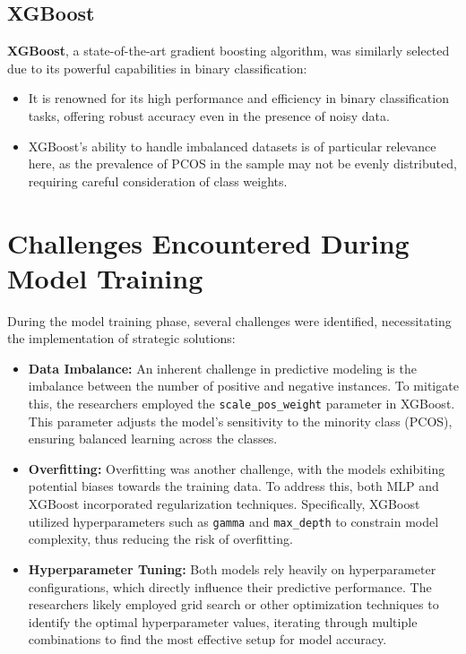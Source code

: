 \documentclass{article}
\begin{document}
\subsection{XGBoost}
\textbf{XGBoost}, a state-of-the-art gradient boosting algorithm, was similarly selected due to its powerful capabilities in binary classification:
\begin{itemize}
    \item It is renowned for its high performance and efficiency in binary classification tasks, offering robust accuracy even in the presence of noisy data.
    \item XGBoost's ability to handle imbalanced datasets is of particular relevance here, as the prevalence of PCOS in the sample may not be evenly distributed, requiring careful consideration of class weights.
\end{itemize}

\section{Challenges Encountered During Model Training}

During the model training phase, several challenges were identified, necessitating the implementation of strategic solutions:

\begin{itemize}
    \item \textbf{Data Imbalance:} An inherent challenge in predictive modeling is the imbalance between the number of positive and negative instances. To mitigate this, the researchers employed the \texttt{scale\_pos\_weight} parameter in XGBoost. This parameter adjusts the model's sensitivity to the minority class (PCOS), ensuring balanced learning across the classes.
    \item \textbf{Overfitting:} Overfitting was another challenge, with the models exhibiting potential biases towards the training data. To address this, both MLP and XGBoost incorporated regularization techniques. Specifically, XGBoost utilized hyperparameters such as \texttt{gamma} and \texttt{max\_depth} to constrain model complexity, thus reducing the risk of overfitting.
    \item \textbf{Hyperparameter Tuning:} Both models rely heavily on hyperparameter configurations, which directly influence their predictive performance. The researchers likely employed grid search or other optimization techniques to identify the optimal hyperparameter values, iterating through multiple combinations to find the most effective setup for model accuracy.
\end{itemize}
\end{document}
